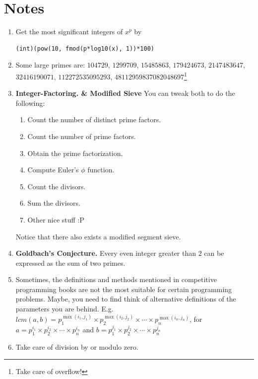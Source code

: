 \documentclass[12pt]{book}
\begin{document}
\section{Notes}
\begin{enumerate}[label = \roman*.]

\item Get the most significant integers of $x^p$ by
\begin{verbatim}
(int)(pow(10, fmod(p*log10(x), 1))*100)
\end{verbatim}
\item
Some large primes are: $104729$, $1299709$, $15485863$, $179424673$, $2147483647$, $32416190071$, $112272535095293$, $48112959837082048697$\footnote{Take care of overflow!}

\item \textbf{Integer-Factoring. \& Modified Sieve}
You can tweak both to do the following:
\begin{enumerate}[label = \roman*.]
\item Count the number of distinct prime factors.
\item Count the number of prime factors.
\item Obtain the prime factorization.
\item Compute Euler's $\phi$ function.
\item Count the divisors.
\item Sum the divisors.
\item Other nice stuff :P
\end{enumerate}
Notice that there also exists a modified segment sieve.

\item
\textbf{Goldbach's Conjecture. } Every even integer greater than $2$ can be expressed as the sum of two primes.

\item
Sometimes, the definitions and methods mentioned in competitive programming books are not the most suitable for certain programming problems. Maybe, you need to find think of alternative definitions of the parameters you are behind. E.g. $lcm(a, b) = p_1^{\max(i_1, j_1)}\times p_2^{\max(i_2, j_2)} \times \cdots \times p_n^{\max(i_n, j_n)}$, for $a = p_1^{i_1}\times p_2^{i_2}\times \cdots \times p_n^{i_n}$ and $b = p_1^{j_1}\times p_2^{j_2}\times \cdots \times p_n^{j_n}$

\item
Take care of division by or modulo zero.


\end{enumerate}
\end{document}
